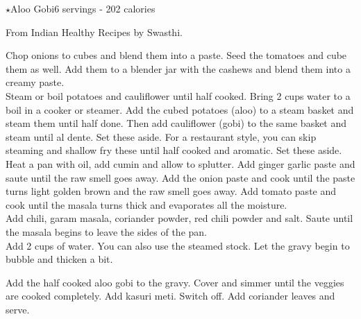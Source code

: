 \begin{recipe}{\texorpdfstring{$\star$}{str}Aloo Gobi}{6 servings - 202 calories}{}

\freeform From Indian Healthy Recipes by Swasthi.


Chop onions to cubes and blend them into a paste. Seed the tomatoes and cube them as well. Add them to a blender jar with the cashews and
blend them into a creamy paste.\\

Steam or boil potatoes and cauliflower until half cooked. Bring 2 cups water to a boil in a cooker or steamer. Add the cubed potatoes (aloo) to a steam basket and steam them until half done. Then add cauliflower (gobi) to the same basket and steam until al dente. Set these aside. For a restaurant style, you can skip steaming and shallow fry these until half cooked and aromatic. Set these aside.\\

Heat a pan with oil, add cumin and allow to splutter. Add ginger garlic paste and saute until the raw smell goes away. Add the onion paste and cook until the paste turns light golden brown and the raw smell goes away. Add tomato paste and cook until the masala turns thick and evaporates all the moisture.\\

Add chili, garam masala, coriander powder, red chili powder and salt. Saute until the masala begins to leave the sides of the pan.\\

Add 2  cups of water. You can also use the steamed stock. Let the gravy begin to bubble and thicken a bit.

Add the half cooked aloo gobi to the gravy. Cover and simmer until the veggies are cooked completely. Add kasuri meti. Switch off. Add coriander leaves and serve.

\end{recipe}
